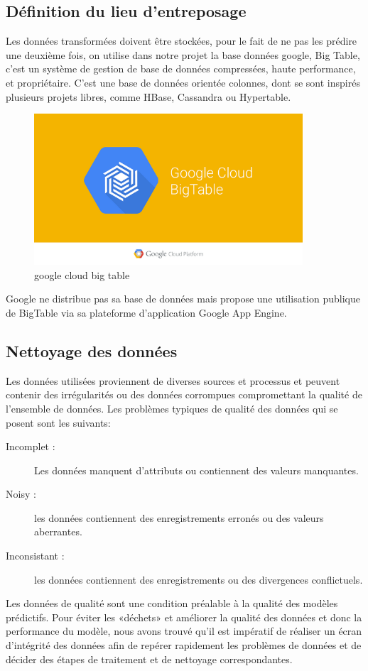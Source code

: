 \subsection{Définition du lieu d'entreposage}
Les données transformées doivent être stockées, pour le fait de ne pas les prédire une deuxième fois, on utilise dans notre projet la base données google, Big Table, c'est un système de gestion de base de données compressées, haute performance, et propriétaire. C'est une base de données orientée colonnes, dont se sont inspirés plusieurs projets libres, comme HBase, Cassandra ou Hypertable.\\
\begin{figure}[H]
	\begin{center}
	\includegraphics[width=100mm,scale=0.5]{Images/google-cloud-bigtable.png}
	\end{center}
	\caption{google cloud big table}
	\label{fig:gglcloudbigtable}
\end{figure}	
 Google ne distribue pas sa base de données mais propose une utilisation publique de BigTable via sa plateforme d'application Google App Engine.
\subsection{Nettoyage des données}
Les données utilisées proviennent de diverses sources et processus et peuvent contenir des irrégularités ou des données corrompues compromettant la qualité de l'ensemble de données. Les problèmes typiques de qualité des données qui se posent sont les suivants:
\begin{description}
\item[Incomplet : ] Les données manquent d'attributs ou contiennent des valeurs manquantes.
\item[Noisy : ]les données contiennent des enregistrements erronés ou des valeurs aberrantes.
\item[Inconsistant : ]les données contiennent des enregistrements ou des divergences conflictuels.
\end{description}
Les données de qualité sont une condition préalable à la qualité des modèles prédictifs. Pour éviter les «déchets» et améliorer la qualité des données et donc la performance du modèle, nous avons trouvé qu'il est impératif de réaliser un écran d'intégrité des données afin de repérer rapidement les problèmes de données et de décider des étapes de traitement et de nettoyage correspondantes.
